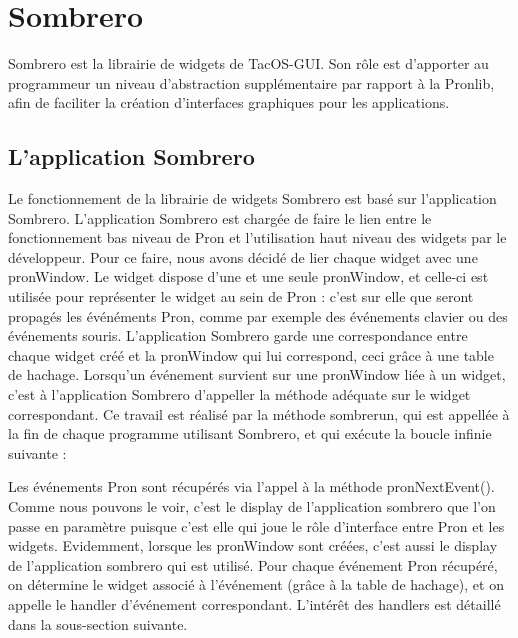 \section{Sombrero}
Sombrero est la librairie de widgets de TacOS-GUI. Son rôle est d'apporter au programmeur un niveau d'abstraction supplémentaire par rapport à la Pronlib, afin de faciliter la création d'interfaces graphiques pour les applications.
\subsection{L'application Sombrero}
Le fonctionnement de la librairie de widgets Sombrero est basé sur l'application Sombrero. L'application Sombrero est chargée de faire le lien entre le fonctionnement bas niveau de Pron et l'utilisation haut niveau des widgets par le développeur. Pour ce faire, nous avons décidé de lier chaque widget avec une pronWindow. Le widget dispose d'une et une seule pronWindow, et celle-ci est utilisée pour représenter le widget au sein de Pron : c'est sur elle que seront propagés les événéments Pron, comme par exemple des événements clavier ou des événements souris. 
L'application Sombrero garde une correspondance entre chaque widget créé et la pronWindow qui lui correspond, ceci grâce à une table de hachage. Lorsqu'un événement survient sur une pronWindow liée à un widget, c'est à l'application Sombrero d'appeller la méthode adéquate sur le widget correspondant. Ce travail est réalisé par la méthode sombrerun, qui est appellée à la fin de chaque programme utilisant Sombrero, et qui exécute la boucle infinie suivante :

Les événements Pron sont récupérés via l'appel à la méthode pronNextEvent(). Comme nous pouvons le voir, c'est le display de l'application sombrero que l'on passe en paramètre puisque c'est elle qui joue le rôle d'interface entre Pron et les widgets. Evidemment, lorsque les pronWindow sont créées, c'est aussi le display de l'application sombrero qui est utilisé. Pour chaque événement Pron récupéré, on détermine le widget associé à l'événement (grâce à la table de hachage), et on appelle le handler d'événement correspondant. L'intérêt des handlers est détaillé dans la sous-section suivante.

